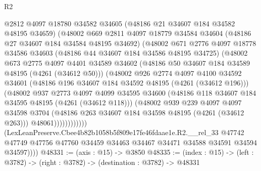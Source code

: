 \begin{lexlean}{R2}
\begin{coremodule}
                      @2812
                      @4097
                      @18780
                      @34582
                      @34605
                      (@48186 @21 @34607 @184 @34582 @48195 @34659)
                      (@48002
                        @669
                        @2811
                        @4097
                        @18779
                        @34584
                        @34604
                        (@48186 @27 @34607 @184 @34584 @48195 @34692)
                        (@48002
                          @671
                          @2776
                          @4097
                          @18778
                          @34586
                          @34603
                          (@48186 @44 @34607 @184 @34586 @48195 @34725)
                          (@48002
                            @673
                            @2775
                            @4097
                            @4401
                            @34589
                            @34602
                            (@48186 @50 @34607 @184 @34589 @48195 (@4261 (@34612 @50)))
                            (@48002
                              @926
                              @2774
                              @4097
                              @4100
                              @34592
                              @34601
                              (@48186 @196 @34607 @184 @34592 @48195 (@4261 (@34612 @196)))
                              (@48002
                                @937
                                @2773
                                @4097
                                @4099
                                @34595
                                @34600
                                (@48186 @118 @34607 @184 @34595 @48195 (@4261 (@34612 @118)))
                                (@48002
                                  @939
                                  @239
                                  @4097
                                  @4097
                                  @34598
                                  @3704
                                  (@48186 @263 @34607 @184 @34598 @48195 (@4261 (@34612 @263)))
                                  @48061))))))))))))
          (LexLeanPreserve.Cbee4b82b1058b5f809e17fe46fdaae1e.R2.__rel_33
            @47742
            @47749
            @47756
            @47760
            @34459
            @34463
            @34467
            @34471
            @34588
            @34591
            @34594
            @34597))))
@48331 := (axis : @15) -> @3850
@48335 := (index : @15) -> (left : @3782) -> (right : @3782) -> (destination : @3782) -> @48331

\end{coremodule}
\end{lexlean}
